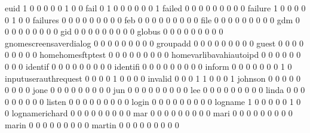 \documentclass[compress,8pt]{beamer}
\begin{document}
\begin{frame}
\begin{Schunk}
  euid                                       1   0   0   0   0   0   1   0   0
  fail                                       0   1   0   0   0   0   0   0   1
  failed                                     0   0   0   0   0   0   0   0   0
  failure                                    1   0   0   0   0   0   1   0   0
  failures                                   0   0   0   0   0   0   0   0   0
  feb                                        0   0   0   0   0   0   0   0   0
  file                                       0   0   0   0   0   0   0   0   0
  gdm                                        0   0   0   0   0   0   0   0   0
  gid                                        0   0   0   0   0   0   0   0   0
  globus                                     0   0   0   0   0   0   0   0   0
  gnomescreensaverdialog                     0   0   0   0   0   0   0   0   0
  groupadd                                   0   0   0   0   0   0   0   0   0
  guest                                      0   0   0   0   0   0   0   0   0
  homehomesftptest                           0   0   0   0   0   0   0   0   0
  homevarlibavahiautoipd                     0   0   0   0   0   0   0   0   0
  identif                                    0   0   0   0   0   0   0   0   0
  identifi                                   0   0   0   0   0   0   0   0   0
  inform                                     0   0   0   0   0   0   0   1   0
  inputuserauthrequest                       0   0   0   0   1   0   0   0   0
  invalid                                    0   0   0   1   1   0   0   0   1
  johnson                                    0   0   0   0   0   0   0   0   0
  jone                                       0   0   0   0   0   0   0   0   0
  jun                                        0   0   0   0   0   0   0   0   0
  lee                                        0   0   0   0   0   0   0   0   0
  linda                                      0   0   0   0   0   0   0   0   0
  listen                                     0   0   0   0   0   0   0   0   0
  login                                      0   0   0   0   0   0   0   0   0
  logname                                    1   0   0   0   0   0   1   0   0
  lognamerichard                             0   0   0   0   0   0   0   0   0
  mar                                        0   0   0   0   0   0   0   0   0
  mari                                       0   0   0   0   0   0   0   0   0
  marin                                      0   0   0   0   0   0   0   0   0
  martin                                     0   0   0   0   0   0   0   0   0

\end{Schunk}
\end{frame}
\end{document}
